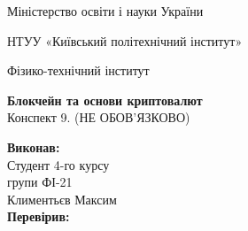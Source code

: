 \documentclass{article}
\begin{document}
    \begin{titlepage}
        \begin{center}

        Міністерство освіти і науки України
        
        НТУУ «Київський політехнічний інститут»
        
        Фізико-технічний інститут
        \vspace{3.3cm}
        
        {\textbf{Блокчейн та основи криптовалют}\\Конспект 9. (НЕ ОБОВ’ЯЗКОВО)}

        \vspace{8.5cm}

        \begin{flushright}
            \textbf{Виконав:}\\Студент 4-го курсу\\групи ФІ-21\\Климентьєв Максим\\
            \textbf{Перевірив:}\\\text{\_\_\_\_\_\_\_\_\_\_\_\_\_\_\_\_\_\_}
        \end{flushright}

        \end{center}
    \end{titlepage}
    \newpage

    \tableofcontents
    \cleardoublepage
    \setcounter{page}{3}

    \newpage
\end{document}
